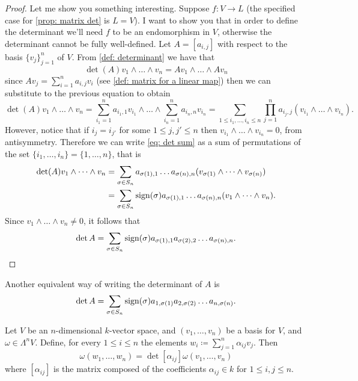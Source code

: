 \begin{proof}
Let me show you something interesting. Suppose \(f: V \to L\) (the specified
case for \cref{prop: matrix det} is \(L = V\)). I want to show you that in
order to define the determinant we'll need \(f\) to be an endomorphism in
\(V\), otherwise the determinant cannot be fully well-defined. Let \(A =
[a_{i, j}]\) with respect to the basis \(\{v_j\}_{j=1}^n\) of \(V\). From
\cref{def: determinant} we have that
\[
  \det(A) v_1 \wedge \dots \wedge v_n = A v_1 \wedge \dots \wedge A v_n
\]
since \(A v_j = \sum_{i = 1}^n a_{i, j} v_i\) (see \cref{def: matrix for a
linear map}) then we can substitute to the previous equation to obtain
\begin{equation}\label{eq: det sum}
  \det(A) v_1 \wedge \dots \wedge v_n
  = \sum_{i_1 = 1}^n a_{i_1, 1} v_{i_1} \wedge \dots \wedge \sum_{i_n = 1}^n
  a_{i_n, n} v_{i_n}
  = \sum_{1 \leq i_1, \dots, i_n \leq n} \prod_{j=1}^n a_{i_j, j} (v_{i_1}
  \wedge \dots \wedge v_{i_n}).
\end{equation}
However, notice that if \(i_j = i_{j'}\) for some \(1 \leq j, j' \leq n\) then
\(v_{i_1} \wedge \dots \wedge v_{i_n} = 0\), from antisymmetry.
Therefore we can write \cref{eq: det sum} as a sum of permutations of the set
\(\{i_1, \dots, i_n\} = \{1, \dots, n\}\), that is
\begin{align*}
  \det(A) v_1 \wedge \dots \wedge v_n
  &= \sum_{\sigma \in S_n} a_{\sigma(1), 1} \dots a_{\sigma(n), n}
  (v_{\sigma(1)} \wedge \dots \wedge v_{\sigma(n)}) \\
  &= \sum_{\sigma \in S_n} \operatorname{sign}(\sigma) a_{\sigma(1), 1} \dots
  a_{\sigma(n), n} (v_1 \wedge \dots \wedge v_n).
\end{align*}
Since \(v_1 \wedge \dots \wedge v_n \neq 0\), it follows that
\[
  \det A = \sum_{\sigma \in S_n} \operatorname{sign}(\sigma) a_{\sigma(1), 1}
  a_{\sigma(2), 2} \dots a_{\sigma(n), n}.
\]
\end{proof}

\begin{corollary}
Another equivalent way of writing the determinant of \(A\) is
\[
  \det A = \sum_{\sigma \in S_n} \operatorname{sign}(\sigma) a_{1, \sigma(1)} a_{2,
  \sigma(2)} \dots a_{n, \sigma(n)}.
\]
\end{corollary}

\begin{proposition}
\label{prop:form-change-basis-det}
Let \(V\) be an \(n\)-dimensional \(k\)-vector space, and \((v_1, \dots,
v_n)\) be a basis for \(V\), and \(\omega \in \Lambda^n V\). Define, for every
\(1 \leq i \leq n\) the elements \(w_i \coloneq \sum_{j=1}^n \alpha_{i j}
v_j\). Then
\[
  \omega(w_1, \dots, w_n) = \det[\alpha_{i j}] \omega(v_1, \dots, v_n)
\]
where \([\alpha_{i j}]\) is the matrix composed of the coefficients
\(\alpha_{ij} \in k\) for \(1 \leq i, j \leq n\).
\end{proposition}

